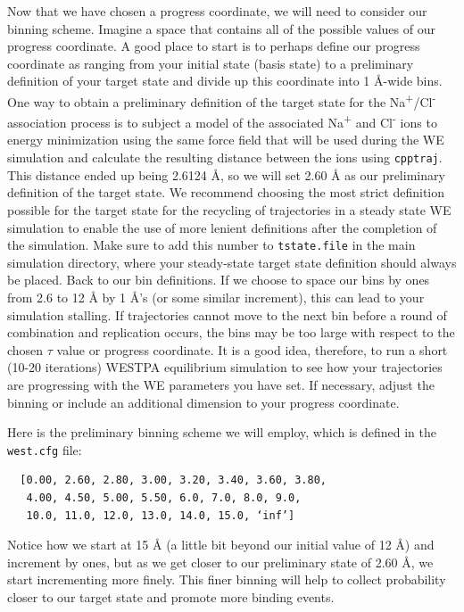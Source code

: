 Now that we have chosen a progress coordinate, we will need to consider our binning scheme. 
Imagine a space that contains all of the possible values of our progress coordinate. 
A good place to start is to perhaps define our progress coordinate as ranging from your initial state (basis state) to a preliminary definition of your target state and divide up this coordinate into 1 \AA{}-wide bins. 
One way to obtain a preliminary definition of the target state for the Na\textsuperscript{+}/Cl\textsuperscript{-} association process is to subject a model of the associated Na\textsuperscript{+} and Cl\textsuperscript{-} ions to energy minimization using the same force field that will be used during the WE simulation and calculate the resulting distance between the ions using \verb|cpptraj|. 
This distance ended up being 2.6124 \AA{}, so we will set 2.60 \AA{} as our preliminary definition of the target state. 
We recommend choosing the most strict definition possible for the target state for the recycling of trajectories in a steady state WE simulation to enable the use of more lenient definitions after the completion of the simulation. 
Make sure to add this number to \verb|tstate.file| in the main simulation directory, where your steady-state target state definition should always be placed.
\newpage
Back to our bin definitions. 
If we choose to space our bins by ones from 2.6 to 12 \AA{} by 1 \AA{}’s (or some similar increment), this can lead to your simulation stalling. 
If trajectories cannot move to the next bin before a round of combination and replication occurs, the bins may be too large with respect to the chosen $\tau$ value or progress coordinate. 
It is a good idea, therefore, to run a short (10-20 iterations) WESTPA equilibrium simulation to see how your trajectories are progressing with the WE parameters you have set.
If necessary, adjust the binning or include an additional dimension to your progress coordinate.

Here is the preliminary binning scheme we will employ, which is defined in the \verb|west.cfg| file:
\begin{verbatim}
  [0.00, 2.60, 2.80, 3.00, 3.20, 3.40, 3.60, 3.80,
   4.00, 4.50, 5.00, 5.50, 6.0, 7.0, 8.0, 9.0,
   10.0, 11.0, 12.0, 13.0, 14.0, 15.0, ‘inf’]
\end{verbatim}
Notice how we start at 15 \AA{} (a little bit beyond our initial value of 12 \AA) and increment by ones, but as we get closer to our preliminary state of 2.60 \AA, we start incrementing more finely. 
This finer binning will help to collect probability closer to our target state and promote more binding events.

